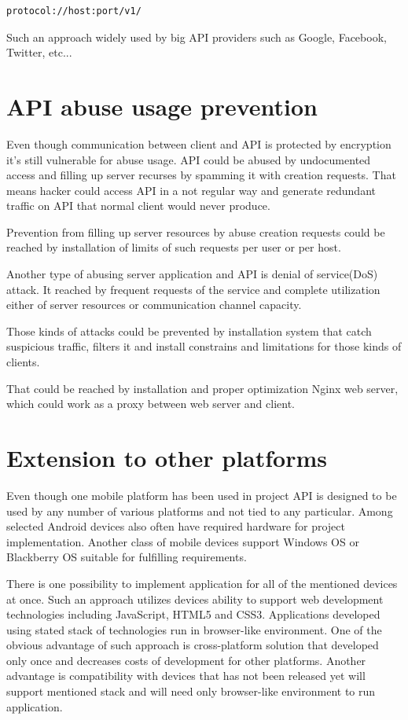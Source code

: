 \documentclass[thesis=M,english]{FITthesis}[2012/10/20]
\begin{document}
\begin{lstlisting}
protocol://host:port/v1/
\end{lstlisting}

Such an approach widely used by big API providers such as Google, Facebook, Twitter, etc...

\section{API abuse usage prevention}


Even though communication between client and API is protected by encryption it's still vulnerable for abuse usage. API could be abused by undocumented access and filling up server recurses by spamming it with creation requests. That means hacker could access API in a not regular way and generate redundant traffic on API that normal client would never produce. 

Prevention from filling up server resources by abuse creation requests could be reached by installation of limits of such requests per user or per host.

Another type of abusing server application and API is denial of service(DoS) attack. It reached by frequent requests of the service and complete utilization either of server resources or communication channel capacity.

Those kinds of attacks could be prevented by installation system that catch suspicious traffic, filters it and install constrains and limitations for those kinds of clients.

That could be reached by installation and proper optimization Nginx web server, which could work as a proxy between web server and client.

\section{Extension to other platforms}

Even though one mobile platform has been used in project API is designed to be used by any number of various platforms and not tied to any particular. Among selected Android devices also often have required hardware for project implementation. Another class of mobile devices support Windows OS or Blackberry OS suitable for fulfilling requirements. 

There is one possibility to implement application for all of the mentioned devices at once. Such an approach utilizes devices ability to support web development technologies including JavaScript, HTML5 and CSS3. Applications developed using stated stack of technologies run in browser-like environment. One of the obvious advantage of such approach is cross-platform solution that developed only once and decreases costs of development for other platforms. Another advantage is compatibility with devices that has not been released yet will support mentioned stack and will need only browser-like environment to run application. 
\end{document}
